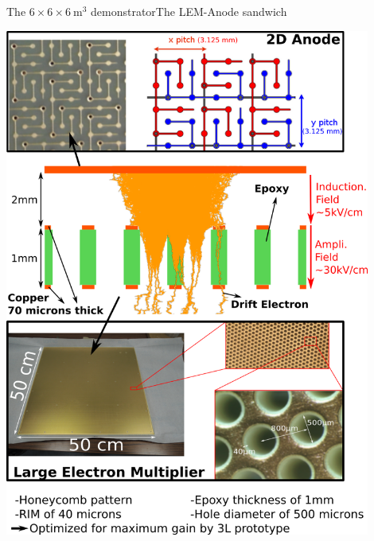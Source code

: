 \documentclass[10pt]{beamer}
\begin{document}
\begin{frame}{The \texorpdfstring{$6 \times 6 \times \SI{6}{\meter\cubed}$}{666}
    		demonstrator}{The LEM-Anode sandwich}
\begin{minipage}{0.48\textwidth}
	   			\includegraphics[width=0.9\textwidth]{figures/666/lem_anode.png}
	   		\end{minipage}
    \end{frame}
    
\end{document}
